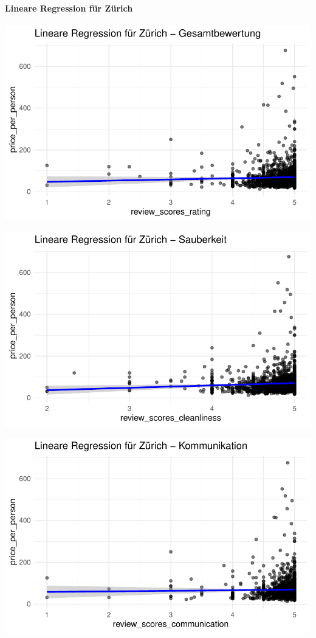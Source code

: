\documentclass[
  journal,
]{IEEEtran}%
\let\oldparagraph\paragraph
\renewcommand{\paragraph}[1]{\oldparagraph{#1}\mbox{}}
\begin{document}
\hypertarget{lineare-regression-fuxfcr-zuxfcrich}{%
\paragraph{Lineare Regression für
Zürich}\label{lineare-regression-fuxfcr-zuxfcrich}}

\includegraphics{main_files/figure-pdf/unnamed-chunk-14-1.pdf}

\includegraphics{main_files/figure-pdf/unnamed-chunk-14-2.pdf}

\includegraphics{main_files/figure-pdf/unnamed-chunk-14-3.pdf}
\end{document}

